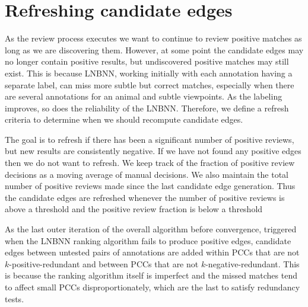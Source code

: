 

\section{Refreshing candidate edges}\label{sec:refresh}

As the review process executes we want to continue to review positive matches
  as long as we are discovering them.
However, at some point the candidate edges may no longer contain positive
  results, but undiscovered positive matches may still exist.  This is because LNBNN, working initially with each annotation having a separate label, can miss more subtle but correct matches, especially when there are several annotations for an animal and subtle viewpoints.
As the labeling improves, so does the reliability of the LNBNN.
Therefore, we define a refresh criteria to determine when we should recompute
  candidate edges.

The goal is to refresh if there has been a significant number of positive
  reviews, but new results are consistently negative.
If we have not found any positive edges then we do not want to refresh.
We keep track of the fraction of positive review decisions as a moving average
  of manual decisions.
We also maintain the total number of positive reviews made since the last
  candidate edge generation.
Thus the candidate edges are refreshed whenever the number of positive reviews
  is above a threshold and the positive review fraction is below a threshold

As the last outer iteration of the overall algorithm before convergence,
  triggered when the LNBNN ranking algorithm fails to produce positive edges,
  candidate edges between untested pairs of annotations are added within PCCs
  that are not $k$-positive-redundant and between PCCs that are not
  $k$-negative-redundant.
This is because the ranking algorithm itself is imperfect and the missed
  matches tend to affect small PCCs disproportionately, which are the last to
  satisfy redundancy tests.


